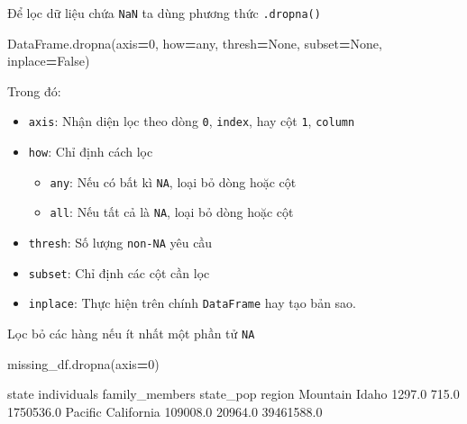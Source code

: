 \documentclass[
]{book}
\newenvironment{Shaded}{\begin{snugshade}}{\end{snugshade}}
\newcommand{\DecValTok}[1]{\textcolor[rgb]{0.00,0.00,0.81}{#1}}
\newcommand{\NormalTok}[1]{#1}
\newcommand{\OperatorTok}[1]{\textcolor[rgb]{0.81,0.36,0.00}{\textbf{#1}}}
\newcommand{\StringTok}[1]{\textcolor[rgb]{0.31,0.60,0.02}{#1}}
\newcommand{\VariableTok}[1]{\textcolor[rgb]{0.00,0.00,0.00}{#1}}
\providecommand{\tightlist}{%
  \setlength{\itemsep}{0pt}\setlength{\parskip}{0pt}}
\begin{document}
Để lọc dữ liệu chứa \texttt{NaN} ta dùng phương thức \texttt{.dropna()}

\begin{Shaded}
\begin{Highlighting}[]
\NormalTok{DataFrame.dropna(axis}\OperatorTok{=}\DecValTok{0}\NormalTok{, how}\OperatorTok{=}\StringTok{\textquotesingle{}any\textquotesingle{}}\NormalTok{, thresh}\OperatorTok{=}\VariableTok{None}\NormalTok{, subset}\OperatorTok{=}\VariableTok{None}\NormalTok{, inplace}\OperatorTok{=}\VariableTok{False}\NormalTok{)}
\end{Highlighting}
\end{Shaded}

Trong đó:

\begin{itemize}
\item
  \texttt{axis}: Nhận diện lọc theo dòng \texttt{0}, \texttt{index}, hay cột \texttt{1}, \texttt{column}
\item
  \texttt{how}: Chỉ định cách lọc

  \begin{itemize}
  \tightlist
  \item
    \texttt{any}: Nếu có bất kì \texttt{NA}, loại bỏ dòng hoặc cột
  \item
    \texttt{all}: Nếu tất cả là \texttt{NA}, loại bỏ dòng hoặc cột
  \end{itemize}
\item
  \texttt{thresh}: Số lượng \texttt{non-NA} yêu cầu
\item
  \texttt{subset}: Chỉ định các cột cần lọc
\item
  \texttt{inplace}: Thực hiện trên chính \texttt{DataFrame} hay tạo bản sao.
\end{itemize}

Lọc bỏ các hàng nếu ít nhất một phần tử \texttt{NA}

\begin{Shaded}
\begin{Highlighting}[]
\NormalTok{missing\_df.dropna(axis}\OperatorTok{=}\DecValTok{0}\NormalTok{)}
\end{Highlighting}
\end{Shaded}

\begin{Shaded}
\begin{Highlighting}[]
\NormalTok{               state  individuals  family\_members   state\_pop}
\NormalTok{region                                                       }
\NormalTok{Mountain       Idaho       1297.0           715.0   1750536.0}
\NormalTok{Pacific   California     109008.0         20964.0  39461588.0}
\end{Highlighting}
\end{Shaded}
\end{document}
